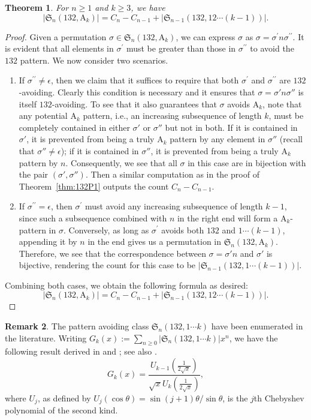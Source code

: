 \documentclass[12pt,reqno]{article}
\numberwithin{equation}{section}
\theoremstyle{plain}
\newtheorem{theorem}{Theorem}[section]
\theoremstyle{definition}
\newtheorem{remark}[theorem]{Remark}
\def\fS{\mathfrak{S}}
\def\rA{\mathrm{A}}
\begin{document}
\begin{theorem}\label{thm:132Ak}
	For $n\geq 1$ and $k\ge 3$, we have 
	$$|\fS_n(132,\rA_k)|=C_{n}-C_{n-1}+|\fS_{n-1}(132,12\cdots(k-1))|.$$
\end{theorem}
\begin{proof}
	Given a permutation $\sigma \in \fS_{n}(132, \rA_k)$, we can express $\sigma$ as $\sigma = \sigma^{\prime} n \sigma^{\prime \prime}$. It is evident that all elements in $\sigma^{\prime}$ must be greater than those in $\sigma^{\prime \prime}$ to avoid the $132$ pattern. We now consider two scenarios.
	\begin{enumerate}
		\item 	If $\sigma^{\prime \prime}\neq\epsilon$, then we claim that it suffices to require that both $\sigma^{\prime}$ and $\sigma^{\prime \prime}$ are $132$-avoiding. Clearly this condition is necessary and it ensures that $\sigma=\sigma'n\sigma''$ is itself $132$-avoiding. To see that it also guarantees that $\sigma$ avoids $\rA_k$, note that any potential $\rA_k$ pattern, i.e., an increasing subsequence of length $k$, must be completely contained in either $\sigma'$ or $\sigma''$ but not in both. If it is contained in $\sigma'$, it is prevented from being a truly $\rA_k$ pattern by any element in $\sigma''$ (recall that $\sigma''\neq\epsilon$); if it is contained in $\sigma''$, it is prevented from being a truly $\rA_k$ pattern by $n$. Consequently, we see that all $\sigma$ in this case are in bijection with the pair $(\sigma',\sigma'')$. Then a similar computation as in the proof of Theorem~\ref{thm:132P1} outputs the count $C_n-C_{n-1}$.
		\item  	If $\sigma^{\prime \prime}=\epsilon$, then $\sigma^{\prime}$ must avoid any increasing subsequence of length $k-1$, since such a subsequence combined with $n$ in the right end will form a $\rA_k$-pattern in $\sigma$. Conversely, as long as $\sigma^{\prime}$ avoids both $132$ and $1\cdots (k-1)$, appending it by $n$ in the end gives us a permutation in $\fS_n(132,\rA_k)$. Therefore, we see that the correspondence between $\sigma=\sigma'n$ and $\sigma'$ is bijective, rendering the count for this case to be $|\fS_{n-1}(132, 1\cdots(k-1))|$.
	\end{enumerate}
	Combining both cases, we obtain the following formula as desired:
	$$|\fS_n(132, \rA_k)| = C_n - C_{n-1} + |\fS_{n-1}(132, 12\cdots(k-1))|.$$
\end{proof}

\begin{remark}
The pattern avoiding class $\fS_n(132,1\cdots k)$ have been enumerated in the literature. Writing $G_k(x):=\sum_{n\ge 0}|\fS_n(132,1\cdots k)|x^n$, we have the following result derived in \cite{CW99} and \cite[Thm.~3.1]{MV00} ; see also \cite[Section~6.1.5]{Kit11}.
$$G_k(x)=\frac{U_{k-1}(\frac{1}{2\sqrt{x}})}{\sqrt{x}U_k(\frac{1}{2\sqrt{x}})},$$
where $U_j$, as defined by $U_j(\cos\theta)=\sin(j+1)\theta/\sin\theta$, is the $j$th Chebyshev polynomial of the second kind.
\end{remark}
\end{document}

